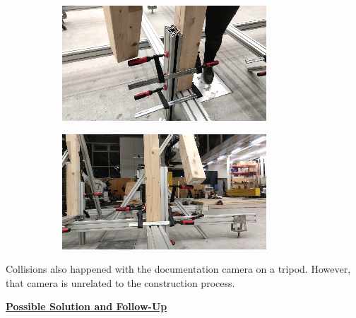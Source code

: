 \documentclass[11pt]{book}
\begin{document}
\begin{figure}[H]
\centering
\begin{subfigure}[b]{0.45\textwidth}
\centering
\includegraphics[width=\textwidth]{./images/image80.png}
\end{subfigure}
\hfill
\begin{subfigure}[b]{0.45\textwidth}
\centering
\includegraphics[width=\textwidth]{./images/image81.png}
\end{subfigure}
\end{figure}


Collisions also happened with the documentation camera on a tripod. However, that camera is unrelated to the construction process.

\textbf{\uline{Possible Solution and Follow-Up}}
\end{document}
